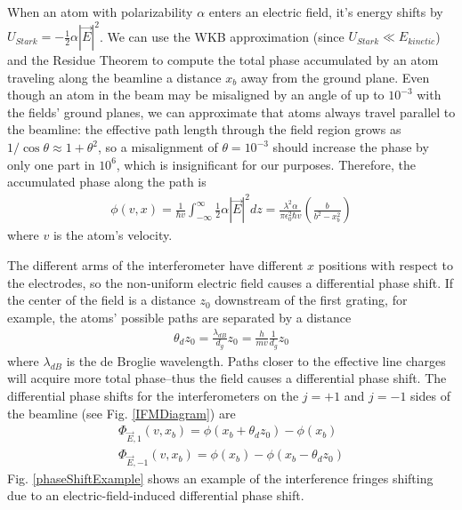 \documentclass[twocolumn, prl,showpacs,superscriptaddress]{revtex4-1}   %
\newcommand{\abs}[1]{\left|#1\right|}
\newcommand{\figref}[1]{Fig. \ref{#1}}
\begin{document}
When an atom with polarizability $\alpha$ enters an electric field, it's energy shifts by $U_{Stark} = -\frac{1}{2}\alpha\abs{\vec{E}}^2$. We can use the WKB approximation (since $U_{Stark} \ll E_{kinetic}$) and the Residue Theorem to compute the total phase accumulated by an atom traveling along the beamline a distance $x_b$ away from the ground plane. Even though an atom in the beam may be misaligned by an angle of up to $10^{-3}$ with the fields' ground planes, we can approximate that atoms always travel parallel to the beamline: the effective path length through the field region grows as $1/\cos{\theta} \approx 1+\theta^2$, so a misalignment of $\theta = 10^{-3}$ should increase the phase by only one part in $10^6$, which is insignificant for our purposes. Therefore, the accumulated phase along the path is
\begin{align}
	\phi(v,x) = 
	\frac{1}{\hbar v} \int_{-\infty}^{\infty} \frac{1}{2} \alpha |\vec{E}|^2 dz =	
	\frac{\lambda^2 \alpha}{\pi \epsilon_0^2 \hbar v}
	\left( \frac{b}{b^2-x_b^2} \right)
	\label{accumPhasePillars}
\end{align}
where $v$ is the atom's velocity.

The different arms of the interferometer have different $x$ positions with respect to the electrodes, so the non-uniform electric field causes a differential phase shift. If the center of the field is a distance $z_0$ downstream of the first grating, for example, the atoms' possible paths are separated by a distance 
\begin{align}
	\theta_d z_0 = \frac{\lambda_{dB}}{d_g} z_0 = \frac{h}{mv}\frac{1}{d_g} z_0
	\label{pathSeparation}
\end{align}
where $\lambda_{dB}$ is the de Broglie wavelength. Paths closer to the effective line charges will acquire more total phase--thus the field causes a differential phase shift. The differential phase shifts for the interferometers on the $j=+1$ and $j=-1$ sides of the beamline (see \figref{IFMDiagram}) are
\begin{align}
	\Phi_{\vec{E},1}(v,x_b) = \phi(x_b+\theta_d z_0) - \phi(x_b) \nonumber \\
	\Phi_{\vec{E},-1}(v,x_b) = \phi(x_b) - \phi(x_b-\theta_d z_0)
	\label{deltaPhasePillars}
\end{align}
\figref{phaseShiftExample} shows an example of the interference fringes shifting due to an electric-field-induced differential phase shift.
\end{document}
